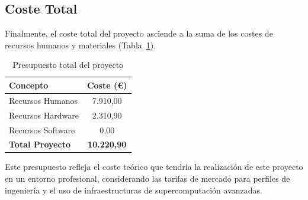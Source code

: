 \subsection{Coste Total}\label{subsec:coste-total}

Finalmente, el coste total del proyecto asciende a la suma de los costes de recursos humanos y materiales (Tabla~\ref{tab:presupuesto_total}).

\begin{table}[h!]
    \centering
    \begin{tabular}{|l|c|}
        \hline
        \textbf{Concepto} & \textbf{Coste (\euro)} \\ \hline
        Recursos Humanos & 7.910,00 \\
        Recursos Hardware & 2.310,90 \\
        Recursos Software & 0,00 \\ \hline
        \textbf{Total Proyecto} & \textbf{10.220,90} \\ \hline
    \end{tabular}
    \caption{Presupuesto total del proyecto}
    \label{tab:presupuesto_total}
\end{table}

Este presupuesto refleja el coste teórico que tendría la realización de este proyecto en un entorno profesional, considerando las tarifas de mercado para perfiles de ingeniería y el uso de infraestructuras de supercomputación avanzadas.
